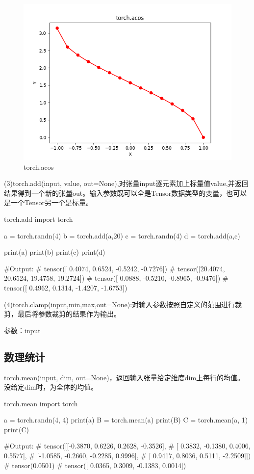 \documentclass[openbib]{article}
\begin{document}
\begin{figure}[htbp]
	\centering
	\includegraphics[scale=0.38]{torch.acos.png}
	\caption{torch.acos}
\end{figure}

(3)torch.add(input, value, out=None),对张量input逐元素加上标量值value,并返回结果得到一个新的张量out。输入参数既可以全是Tensor数据类型的变量，也可以是一个Tensor另一个是标量。
\begin{Python}{torch.add}
	import torch
	
	a = torch.randn(4)
	b = torch.add(a,20)
	c = torch.randn(4)
	d = torch.add(a,c)
	
	print(a)
	print(b)
	print(c)
	print(d)
	
	#Output:
	#		tensor([ 0.4074,  0.6524, -0.5242, -0.7276])
	#		tensor([20.4074, 20.6524, 19.4758, 19.2724])
	#		tensor([ 0.0888, -0.5210, -0.8965, -0.9476])
	#		tensor([ 0.4962,  0.1314, -1.4207, -1.6753])
\end{Python}
(4)torch.clamp(input,min,max,out=None):对输入参数按照自定义的范围进行裁剪，最后将参数裁剪的结果作为输出。

参数：input
\subsection{数理统计}
torch.mean(input, dim, out=None)，返回输入张量给定维度dim上每行的均值。没给定dim时，为全体的均值。

\begin{Python}{torch.mean}
	import torch
	
	a = torch.randn(4, 4)
	print(a)
	B = torch.mean(a)
	print(B)
	C = torch.mean(a, 1)
	print(C)
	
	#Output:
	#       tensor([[-0.3870,  0.6226,  0.2628, -0.3526],
	#               [ 0.3832, -0.1380,  0.4006,  0.5577],
	#               [-1.0585, -0.2660, -0.2285,  0.9996],
	#               [ 0.9417,  0.8036,  0.5111, -2.2509]])
	#       tensor(0.0501)
	#       tensor([ 0.0365,  0.3009, -0.1383,  0.0014])
	
\end{Python}
\end{document}
